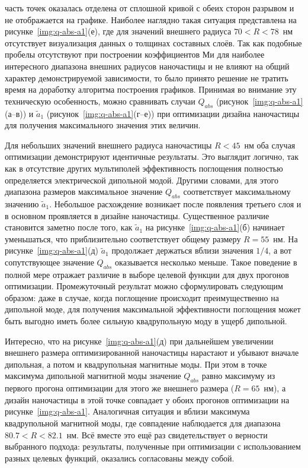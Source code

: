 часть точек оказалась отделена от сплошной кривой с обеих сторон
разрывом и не отображается на графике.  Наиболее наглядно такая
ситуация представлена на рисунке~\ref{img:q-abs-a1}(е), где для
значений внешнего радиуса $70<R<78$~нм отсутствует визуализация данных
о толщинах составных слоёв.  Так как подобные пробелы отсутствуют при
построении коэффициентов Ми для наиболее интересного диапазона внешних
радиусов наночастицы и не влияют на общий характер демонстрируемой
зависимости, то было принято решение не тратить время на доработку
алгоритма построения графиков.  Принимая во внимание эту техническую
особенность, можно сравнивать случаи $Q_{abs}$
(рисунок~\ref{img:q-abs-a1}(а--в)) и $\tilde{a}_1$
(рисунок~\ref{img:q-abs-a1}(г--е)) при оптимизации дизайна наночастицы
для получения максимального значения этих величин.

Для небольших значений внешнего радиуса наночастицы $R<45$~нм оба
случая оптимизации демонстрируют идентичные результаты. Это выглядит
логично, так как в отсутствие других мультиполей эффективность
поглощения полностью определяется электрической дипольной
модой. Другими словами, для этого диапазона размеров максимальное
значение $Q_{abs}$ соответствует максимальному значению
$\tilde{a}_1$. Небольшое расхождение возникает после появления
третьего слоя и в основном проявляется в дизайне наночастицы.
Существенное различие становится заметно после того, как $\tilde{a}_1$
на рисунке~\ref{img:q-abs-a1}(б) начинает уменьшаться, что
приблизительно соответствует общему размеру $R=55$~нм. На
рисунке~\ref{img:q-abs-a1}(д) $\tilde{a}_1$ продолжает держаться
вблизи значения $1/4$, а вот сопутствующее значение $Q_{abs}$
оказывается несколько меньше. Такое поведение в полной мере отражает
различие в выборе целевой функции для двух прогонов
оптимизации. Промежуточный результат можно сформулировать следующим
образом: даже в случае, когда поглощение происходит преимущественно на
дипольной моде, для получения максимальной эффективности поглощения
может быть выгодно иметь более сильную квадрупольную моду в ущерб
дипольной.

Интересно, что на рисунке~\ref{img:q-abs-a1}(д) при дальнейшем
увеличении внешнего размера оптимизированной наночастицы нарастают и
убывают вначале дипольная, а потом и квадрупольная магнитные моды. При
этом в точке максимума дипольной магнитной моды значение $Q_{abs}$
равно максимуму из первого прогона оптимизации для этого же внешнего
размера ($R=65$~нм), а дизайн наночастицы в этой точке совпадает у
обоих прогонов оптимизации на рисунке~\ref{img:q-abs-a1}.  Аналогичная
ситуация и вблизи максимума квадрупольной магнитной моды, где
совпадение наблюдается для диапазона $80.7<R<82.1$~нм.  Всё вместе это
ещё раз свидетельствует о верности выбранного подхода: результаты,
полученные при оптимизации с использованием разных целевых функций,
оказались согласованы между собой. 

